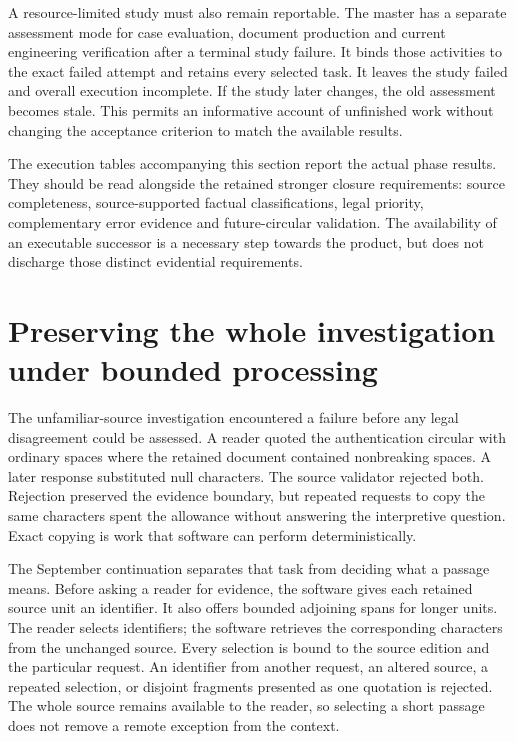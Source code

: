 \documentclass[12pt,a4paper,oneside,openany]{book}
\begin{document}
A resource-limited study must also remain reportable. The master has a separate
assessment mode for case evaluation, document production and current engineering
verification after a terminal study failure. It binds those activities to the
exact failed attempt and retains every selected task. It leaves the study
failed and overall execution incomplete. If the study later changes, the old
assessment becomes stale. This permits an informative account of unfinished
work without changing the acceptance criterion to match the available results.

The execution tables accompanying this section report the actual phase results.
They should be read alongside the retained stronger closure requirements:
source completeness, source-supported factual classifications, legal priority,
complementary error evidence and future-circular validation. The availability
of an executable successor is a necessary step towards the product, but does
not discharge those distinct evidential requirements.

\section{Preserving the whole investigation under bounded processing}
\label{sec:processing-continuation}

The unfamiliar-source investigation encountered a failure before any legal
disagreement could be assessed. A reader quoted the authentication circular
with ordinary spaces where the retained document contained nonbreaking spaces.
A later response substituted null characters. The source validator rejected
both. Rejection preserved the evidence boundary, but repeated requests to copy
the same characters spent the allowance without answering the interpretive
question. Exact copying is work that software can perform deterministically.

The September continuation separates that task from deciding what a passage
means. Before asking a reader for evidence, the software gives each retained
source unit an identifier. It also offers bounded adjoining spans for longer
units. The reader selects identifiers; the software retrieves the corresponding
characters from the unchanged source. Every selection is bound to the source
edition and the particular request. An identifier from another request, an
altered source, a repeated selection, or disjoint fragments presented as one
quotation is rejected. The whole source remains available to the reader, so
selecting a short passage does not remove a remote exception from the context.
\end{document}
